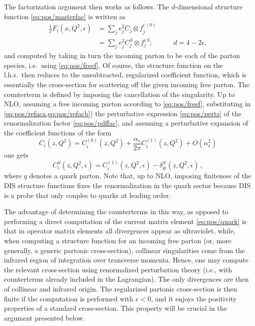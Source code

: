 The factorization argument then works as follows. The $d$-dimensional structure
function \cref{eq:pos/masterfac} is
written as
\begin{align} \label{eq:pos/refaca}
 \frac{1}{x} F_i(x,Q^2,\epsilon)&=\sum_{j} e^2_j C_j \otimes f_j^{i\,(0)} \\
&=\sum_{j} e^2_j C_j^S \otimes f_j^{i\,S};\qquad\quad d=4-2\epsilon,
\label{eq:pos/refacb}
\end{align}
and computed by taking in turn  the incoming parton to be each of the
parton species, i.e.\ using \cref{eq:pos/freef}.
  Of course, the structure
function on the l.h.s.\ then reduces to the
unsubtracted, regularized coefficient
function, which is essentially the cross-section for scattering off
the given incoming free parton. The counterterm is defined by imposing the
cancellation of the singularity. Up to NLO, assuming a free incoming
parton according to \cref{eq:pos/freef}, substituting in
\cref{eq:pos/refaca,eq:pos/refacb}) the
perturbative expression \cref{eq:pos/pertz} of the 
renormalization factor \cref{eq:pos/pdffac}, and assuming a
perturbative expansion of the coefficient functions of the form
\begin{equation}\label{eq:pos/perc}
  C_i(z,Q^2)= C^{(0)}_i(z,Q^2)+\frac{\alpha_s}{2\pi} C^{(1)}_i(z,Q^2)+O(\alpha_s^2)
\end{equation} 
one gets
\begin{equation}\label{eq:pos/renorm}
    C_i^S(z,Q^2,\epsilon) = 
    {C^{(1)}_{i}}(z,Q^2,\epsilon)
    -\delta_{qi}^S(z,Q^2,\epsilon)\,,
\end{equation}
where $q$ denotes a quark parton.
Note that, up to NLO, imposing finiteness of the DIS structure
functions fixes the renormalization in the quark sector because DIS is
a probe that only couples to quarks at leading order.

The advantage of determining the counterterms in this way, as opposed
to performing a direct computation of the current matrix element
\cref{eq:pos/quark} is that in  operator matrix
elements all divergences appear as ultraviolet, while, when computing a
structure function for an incoming free parton  (or, more
generally, a generic partonic cross-section), collinear singularities
come from the infrared region of integration over
transverse momenta. Hence, one may compute the relevant
cross-section using renormalized perturbation theory (i.e., with
counterterms already included in the Lagrangian). The only divergences
are then of collinear and infrared origin.
The regularized partonic cross-section is
then finite if the computation is
performed with $\epsilon<0$, and it enjoys the positivity
properties of a standard 
cross-section. This property will be crucial in the argument presented
 below.

